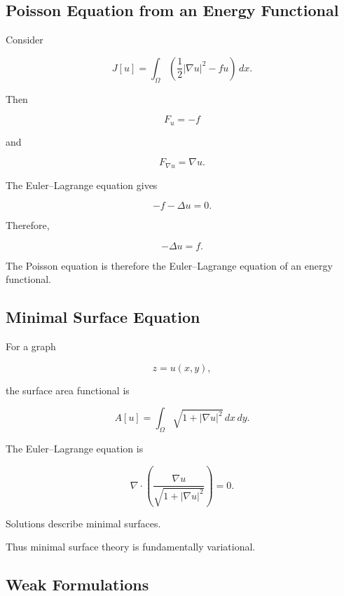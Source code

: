 \subsection{Poisson Equation from an Energy Functional}
\label{subsec:poisson-variational}

Consider

\[
\boxed{
J[u]
=
\int_\Omega
\left(
\frac12|\nabla u|^2
-
fu
\right)\,dx.
}
\]

Then

\[
F_u=-f
\]

and

\[
F_{\nabla u}=\nabla u.
\]

The Euler--Lagrange equation gives

\[
-f-\Delta u=0.
\]

Therefore,

\[
\boxed{
-\Delta u=f.
}
\]

The Poisson equation is therefore the Euler--Lagrange equation of an
energy functional.

\subsection{Minimal Surface Equation}
\label{subsec:minimal-surface-equation}

For a graph

\[
z=u(x,y),
\]

the surface area functional is

\[
\boxed{
A[u]
=
\int_\Omega
\sqrt{1+|\nabla u|^2}\,dx\,dy.
}
\]

The Euler--Lagrange equation is

\[
\boxed{
\nabla\cdot
\left(
\frac{\nabla u}
{\sqrt{1+|\nabla u|^2}}
\right)
=
0.
}
\]

Solutions describe minimal surfaces.

Thus minimal surface theory is fundamentally variational.

\subsection{Weak Formulations}
\label{subsec:variational-weak-formulations}

